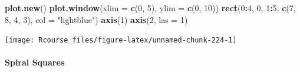 \documentclass[]{book}
\newenvironment{Shaded}{\begin{snugshade}}{\end{snugshade}}
\newcommand{\KeywordTok}[1]{\textcolor[rgb]{0.13,0.29,0.53}{\textbf{#1}}}
\newcommand{\DataTypeTok}[1]{\textcolor[rgb]{0.13,0.29,0.53}{#1}}
\newcommand{\DecValTok}[1]{\textcolor[rgb]{0.00,0.00,0.81}{#1}}
\newcommand{\StringTok}[1]{\textcolor[rgb]{0.31,0.60,0.02}{#1}}
\newcommand{\OperatorTok}[1]{\textcolor[rgb]{0.81,0.36,0.00}{\textbf{#1}}}
\newcommand{\NormalTok}[1]{#1}
\let\oldparagraph\paragraph
\renewcommand{\paragraph}[1]{\oldparagraph{#1}\mbox{}}
\theoremstyle{definition}
\theoremstyle{definition}
\theoremstyle{definition}
\theoremstyle{remark}
\begin{document}
\begin{Shaded}
\begin{Highlighting}[]
\KeywordTok{plot.new}\NormalTok{()}
\KeywordTok{plot.window}\NormalTok{(}\DataTypeTok{xlim =} \KeywordTok{c}\NormalTok{(}\DecValTok{0}\NormalTok{, }\DecValTok{5}\NormalTok{), }\DataTypeTok{ylim =} \KeywordTok{c}\NormalTok{(}\DecValTok{0}\NormalTok{, }\DecValTok{10}\NormalTok{))}
\KeywordTok{rect}\NormalTok{(}\DecValTok{0}\OperatorTok{:}\DecValTok{4}\NormalTok{, }\DecValTok{0}\NormalTok{, }\DecValTok{1}\OperatorTok{:}\DecValTok{5}\NormalTok{, }\KeywordTok{c}\NormalTok{(}\DecValTok{7}\NormalTok{, }\DecValTok{8}\NormalTok{, }\DecValTok{4}\NormalTok{, }\DecValTok{3}\NormalTok{), }\DataTypeTok{col =} \StringTok{"lightblue"}\NormalTok{)}
\KeywordTok{axis}\NormalTok{(}\DecValTok{1}\NormalTok{)}
\KeywordTok{axis}\NormalTok{(}\DecValTok{2}\NormalTok{, }\DataTypeTok{las =} \DecValTok{1}\NormalTok{)}
\end{Highlighting}
\end{Shaded}

\texttt{[image: Rcourse\_files/figure-latex/unnamed-chunk-224-1]}

\paragraph{Spiral Squares}\label{spiral-squares}
\end{document}
